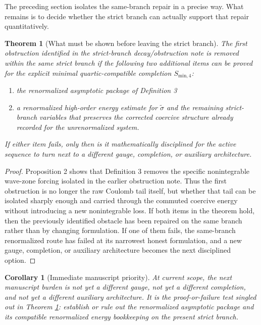 \documentclass[11pt]{article}
\newtheorem{corollary}{Corollary}
\newtheorem{theorem}{Theorem}
\begin{document}
The preceding section isolates the same-branch repair in a precise way. What remains is to decide whether the strict branch can actually support that repair quantitatively.

\begin{theorem}[What must be shown before leaving the strict branch]
The first obstruction identified in the strict-branch decay/obstruction note is removed \emph{within the same strict branch} if the following two additional items can be proved for the explicit minimal quartic-compatible completion \(S_{\mathrm{min},4}\):
\begin{enumerate}
    \item the renormalized asymptotic package of Definition 3
    \item a renormalized high-order energy estimate for \(\widetilde{\sigma}\) and the remaining strict-branch variables that preserves the corrected coercive structure already recorded for the unrenormalized system.
\end{enumerate}
If either item fails, only then is it mathematically disciplined for the active sequence to turn next to a different gauge, completion, or auxiliary architecture.
\label{thm:decision}
\end{theorem}

\begin{proof}
Proposition 2 shows that Definition 3 removes the specific nonintegrable wave-zone forcing isolated in the earlier obstruction note. Thus the first obstruction is no longer the raw Coulomb tail itself, but whether that tail can be isolated sharply enough and carried through the commuted coercive energy without introducing a new nonintegrable loss. If both items in the theorem hold, then the previously identified obstacle has been repaired on the same branch rather than by changing formulation. If one of them fails, the same-branch renormalized route has failed at its narrowest honest formulation, and a new gauge, completion, or auxiliary architecture becomes the next disciplined option.
\end{proof}

\begin{corollary}[Immediate manuscript priority]
At current scope, the next manuscript burden is not yet a different gauge, not yet a different completion, and not yet a different auxiliary architecture. It is the proof-or-failure test singled out in Theorem \ref{thm:decision}: establish or rule out the renormalized asymptotic package and its compatible renormalized energy bookkeeping on the present strict branch.
\end{corollary}
\end{document}
